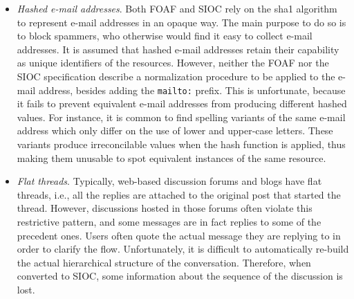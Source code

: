 \documentclass{../templates/www2008-submission}
\begin{document}
\begin{itemize}
        A comprehensive knowledge base of FOAF descriptions can prove
        very useful in this task. However, it introduces another related issue:
        as anyone can create FOAF descriptions, there may exist more than
        one instance of \texttt{foaf:Person} in the knowledge base
        to describe the same person.
        Consolidation of these instances is a similar problem to the
        one just described, and receives the name of "instance
        smushing"\footnote{\texttt{http://esw.w3.org/topic/RdfSmushing}}.
        For our experiments, we crawled a dataset 4,000 FOAF descriptions
        from Advogato\footnote{\texttt{http://www.advogato.org/}}, a social
        network for free software developers.

  \item \emph{Hashed e-mail addresses}. Both FOAF and SIOC
        rely on the sha1 algorithm~\cite{Eastlake2001} to represent
        e-mail addresses in an opaque way. The main purpose to do so
        is to block spammers, who otherwise would find it easy to collect
        e-mail addresses. It is
        assumed that hashed e-mail addresses retain their capability
        as unique identifiers of the resources. However, neither
        the FOAF nor the SIOC specification describe a normalization
        procedure to be applied to the e-mail address, besides adding
        the \texttt{mailto:} prefix. This is unfortunate, because it
        fails to prevent equivalent
        e-mail addresses from producing different hashed values. For instance,
        it is common to find spelling variants of the same
        e-mail address which only differ on the use of lower and upper-case
        letters. These variants produce irreconcilable values
        when the hash function is applied, thus making them unusable
        to spot equivalent instances of the same resource.

  \item \emph{Flat threads}. Typically, web-based discussion forums and blogs
        have flat threads, i.e., all the replies are attached to the original
        post that started the thread. However, discussions hosted in those
        forums often violate this restrictive pattern, and some messages
        are in fact replies to some of the precedent ones. Users often
        quote the actual message they are replying to in order to clarify the
        flow. Unfortunately, it is difficult to automatically re-build
        the actual hierarchical structure of the conversation. Therefore,
        when converted to SIOC, some information about the sequence of
        the discussion is lost.


\end{itemize}
\end{document}
